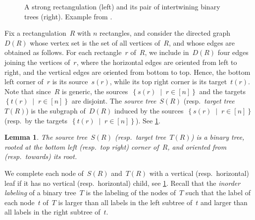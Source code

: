 \documentclass{amsart}
\newtheorem{lemma}[theorem]{Lemma}
\theoremstyle{definition}
\newcommand{\set}[2]{\left\{ #1 \;\middle|\; #2 \right\}} %
\newcommand{\darkblue}{\color{darkblue}} %
\newcommand{\defn}[1]{\textsl{\darkblue #1}} %
\begin{document}
\begin{figure}
	\caption{\label{fig:sourceTargetTrees}A strong rectangulation (left) and its pair of intertwining binary trees (right). Example from \cite{AsinowskiCardinalFelsnerFusy}.}
\end{figure}

Fix a rectangulation~$R$ with $n$ rectangles, and consider the directed graph~$D(R)$ whose vertex set is the set of all vertices of~$R$, and whose edges are obtained as follows.
For each rectangle~$r$ of~$R$, we include in~$D(R)$ four edges joining the vertices of~$r$, where the horizontal edges are oriented from left to right, and the vertical edges are oriented from bottom to top.
Hence, the bottom left corner of~$r$ is its source~$s(r)$, while its top right corner is its target~$t(r)$.
Note that since~$R$ is generic, the sources~$\set{s(r)}{r \in [n]}$ and the targets~$\set{t(r)}{r \in [n]}$ are disjoint.
The \defn{source tree}~$S(R)$ (resp.~\defn{target tree}~$T(R)$) is the subgraph of~$D(R)$ induced by the sources~$\set{s(r)}{r \in [n]}$ (resp.~by the targets~$\set{t(r)}{r \in [n]}$).
See \cref{fig:sourceTargetTrees}.

\begin{lemma}
The source tree~$S(R)$ (resp.~target tree~$T(R)$) is a binary tree, rooted at the bottom left (resp.~top right) corner of~$R$, and oriented from (resp.~towards) its root.
\end{lemma}

We complete each node of~$S(R)$ and~$T(R)$ with a vertical (resp.~horizontal) leaf if it has no vertical (resp.~horizontal) child, see \cref{fig:sourceTargetTrees}.
Recall that the \defn{inorder labeling} of a binary tree~$T$ is the labeling of the nodes of~$T$ such that the label of each node~$t$ of~$T$ is larger than all labels in the left subtree of~$t$ and larger than all labels in the right subtree of~$t$.
\end{document}

